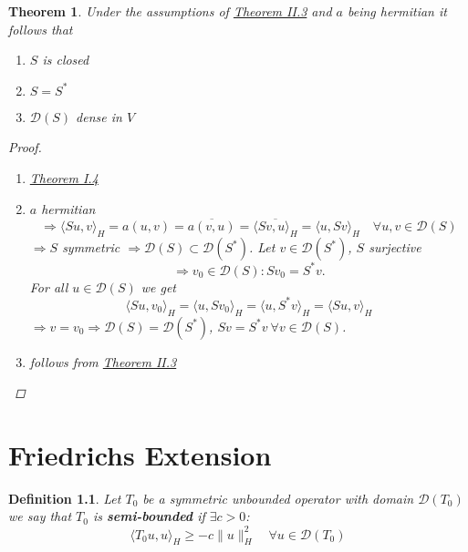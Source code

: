 \documentclass[12pt]{extreport} %
\newcommand{\DO}[1]{\mathcal{D}\left( {#1} \right)}
\theoremstyle{named}
\theoremstyle{nnamed}
\theoremstyle{itshape}
\newtheorem{definition}{Definition}  \counterwithin{definition}{chapter}
\newtheorem{theorem}{Theorem}  \counterwithin{theorem}{chapter}
\theoremstyle{normal}
\begin{document}
\begin{theorem}
	Under the assumptions of \hyperref[thm:2.3]{Theorem II.3} and $a$ being hermitian it follows that
		\begin{enumerate}
			\item $S$ is closed
			\item $S = S^*$
			\item $\DO{S}$ dense in $V$
		\end{enumerate}
		
		\begin{proof} ~\
			\begin{enumerate}
				\item \hyperref[thm:1.4]{Theorem I.4}
				\item $a$ hermitian
					$$ \Rightarrow \langle Su, v \rangle_H = a(u, v) = \overline{a(v, u)} = \overline{\langle Sv, u \rangle_H} = \langle u, Sv \rangle_H \quad \forall u, v \in \DO{S} $$
					$\Rightarrow S$ symmetric $\Rightarrow \DO{S} \subset \DO{S^*}$. Let $v \in \DO{S^*}$, $S$ surjective 
						$$\Rightarrow v_0 \in \DO{S}: S v_0 = S^* v. $$ 
					For all $u \in \DO{S}$ we get
					$$ \langle Su, v_0 \rangle_H = \langle u, S v_0 \rangle_H = \langle u, S^* v \rangle_H = \langle S u, v \rangle_H $$
					$\Rightarrow v = v_0 \Rightarrow \DO{S} = \DO{S^*}$, $Sv = S^* v ~\forall v \in \DO{S}$.
				\item follows from \hyperref[thm:2.3]{Theorem II.3}
			\end{enumerate}	
		\end{proof}
\end{theorem}

\chapter{Friedrichs Extension}

 
\begin{definition}
	Let $T_0$ be a symmetric unbounded operator with domain $\DO{T_0}$ we say that $T_0$ is \textbf{semi-bounded} if $\exists c > 0$:
		$$ \langle T_0 u, u \rangle_H \geq - c \| u \|_H^2 \quad \forall u \in \DO{T_0} $$	
\end{definition}
\end{document}
